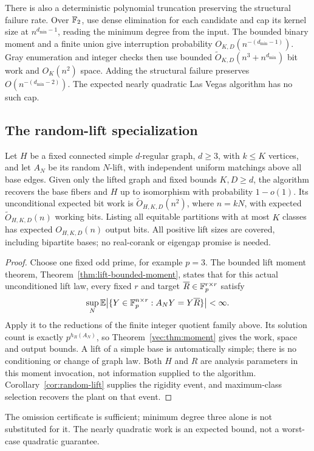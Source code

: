 There is also a deterministic polynomial truncation preserving the
structural failure rate. Over $\mathbb F_2$, use dense elimination for each
candidate and cap its kernel size at $n^{d_{\min}-1}$, reading the minimum degree from the input. The bounded binary moment and a finite union give
interruption probability $O_{K,D}(n^{-(d_{\min}-1)})$. Gray enumeration and
integer checks then use bounded
$\widetilde O_{K,D}(n^3+n^{d_{\min}})$ bit work and $O_K(n^2)$ space.
Adding the structural failure preserves $O(n^{-(d_{\min}-2)})$.
The expected nearly quadratic Las Vegas algorithm has no such cap.

\subsection{The random-lift specialization}
\begin{corollary}
\label{vec:cor:lift}
Let $H$ be a fixed connected simple $d$-regular graph, $d\ge3$,
with $k\le K$ vertices, and let $A_N$ be its random $N$-lift,
with independent uniform matchings above all base edges. Given only
the lifted graph and fixed bounds $K,D\ge d$, the algorithm recovers
the base fibers and $H$ up to isomorphism with probability $1-o(1)$.
Its unconditional expected bit work is
$\widetilde O_{H,K,D}(n^2)$, where $n=kN$, with expected
$\widetilde O_{H,K,D}(n)$ working bits. Listing all equitable
partitions with at most $K$ classes has expected $O_{H,K,D}(n)$
output bits. All positive lift sizes are covered, including bipartite
bases; no real-corank or eigengap promise is needed.
\end{corollary}
\begin{proof}
Choose one fixed odd prime, for example $p=3$. The bounded lift
moment theorem, Theorem~\ref{thm:lift-bounded-moment}, states that
for this actual unconditioned lift law, every fixed $r$ and target
$\overline R\in\mathbb F_p^{r\times r}$ satisfy
\[
 \sup_N\mathbb E\bigl|\{Y\in\mathbb F_p^{n\times r}:A_NY=Y\overline R\}\bigr|
 <\infty.
\]
Apply it to the reductions of the finite integer quotient family
above. Its solution count is exactly $p^{h_R(A_N)}$, so
Theorem~\ref{vec:thm:moment} gives the work, space and output bounds.
A lift of a simple base is automatically simple; there is no
conditioning or change of graph law. Both $H$ and $R$ are analysis
parameters in this moment invocation, not information supplied to
the algorithm. Corollary~\ref{cor:random-lift} supplies the rigidity
event, and maximum-class selection recovers the plant on that event.
\end{proof}

The omission certificate is sufficient; minimum degree three alone is
not substituted for it. The nearly quadratic work is an expected bound,
not a worst-case quadratic guarantee.
